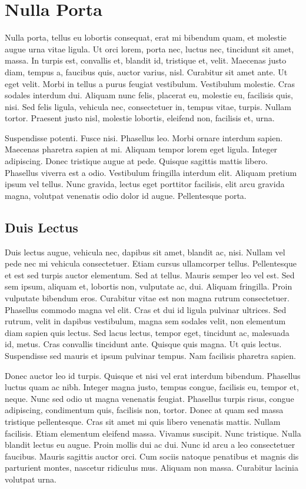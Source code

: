 \chapter{Nulla Porta}\label{NullaPorta}
Nulla porta, tellus eu lobortis consequat, erat mi bibendum quam, et molestie augue urna vitae ligula. Ut orci lorem, porta nec, luctus nec, tincidunt sit amet, massa. In turpis est, convallis et, blandit id, tristique et, velit. Maecenas justo diam, tempus a, faucibus quis, auctor varius, nisl. Curabitur sit amet ante. Ut eget velit. Morbi in tellus a purus feugiat vestibulum. Vestibulum molestie. Cras sodales interdum dui. Aliquam nunc felis, placerat eu, molestie eu, facilisis quis, nisi. Sed felis ligula, vehicula nec, consectetuer in, tempus vitae, turpis. Nullam tortor. Praesent justo nisl, molestie lobortis, eleifend non, facilisis et, urna. 

Suspendisse potenti. Fusce nisi. Phasellus leo. Morbi ornare interdum sapien. Maecenas pharetra sapien at mi. Aliquam tempor lorem eget ligula. Integer adipiscing. Donec tristique augue at pede. Quisque sagittis mattis libero. Phasellus viverra est a odio. Vestibulum fringilla interdum elit. Aliquam pretium ipsum vel tellus. Nunc gravida, lectus eget porttitor facilisis, elit arcu gravida magna, volutpat venenatis odio dolor id augue. Pellentesque porta. 



\section{Duis Lectus}\label{NullaPorta_DuisLectus}
Duis lectus augue, vehicula nec, dapibus sit amet, blandit ac, nisi. Nullam vel pede nec mi vehicula consectetuer. Etiam cursus ullamcorper tellus. Pellentesque et est sed turpis auctor elementum. Sed at tellus. Mauris semper leo vel est. Sed sem ipsum, aliquam et, lobortis non, vulputate ac, dui. Aliquam fringilla. Proin vulputate bibendum eros. Curabitur vitae est non magna rutrum consectetuer. Phasellus commodo magna vel elit. Cras et dui id ligula pulvinar ultrices. Sed rutrum, velit in dapibus vestibulum, magna sem sodales velit, non elementum diam sapien quis lectus. Sed lacus lectus, tempor eget, tincidunt ac, malesuada id, metus. Cras convallis tincidunt ante. Quisque quis magna. Ut quis lectus. Suspendisse sed mauris et ipsum pulvinar tempus. Nam facilisis pharetra sapien. 

Donec auctor leo id turpis. Quisque et nisi vel erat interdum bibendum. Phasellus luctus quam ac nibh. Integer magna justo, tempus congue, facilisis eu, tempor et, neque. Nunc sed odio ut magna venenatis feugiat. Phasellus turpis risus, congue adipiscing, condimentum quis, facilisis non, tortor. Donec at quam sed massa tristique pellentesque. Cras sit amet mi quis libero venenatis mattis. Nullam facilisis. Etiam elementum eleifend massa. Vivamus suscipit. Nunc tristique. Nulla blandit lectus eu augue. Proin mollis dui ac dui. Nunc id arcu a leo consectetuer faucibus. Mauris sagittis auctor orci. Cum sociis natoque penatibus et magnis dis parturient montes, nascetur ridiculus mus. Aliquam non massa. Curabitur lacinia volutpat urna. 

